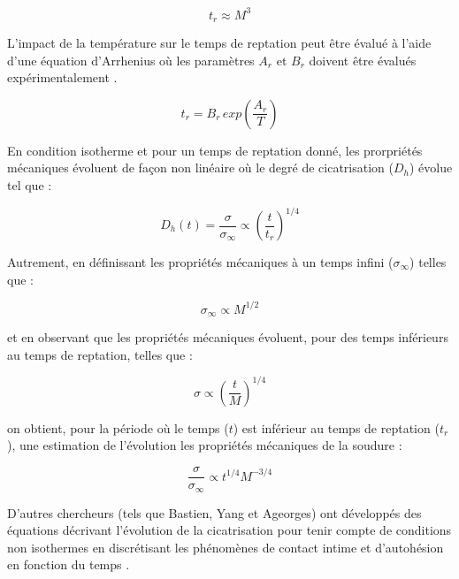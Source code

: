 \begin{equation}
t_r \approx M^3
\end{equation}

L'impact de la température sur le temps de reptation peut être évalué à l'aide d'une équation d'Arrhenius où les paramètres $A_r$ et $B_r$  doivent être évalués expérimentalement \cite{Bastien1991,Ageorges1998}. 

\begin{equation}
t_r = B_r \, exp \left( \frac{A_r}{T} \right)
\end{equation}

En condition isotherme et pour un temps de reptation donné, les prorpriétés mécaniques évoluent de façon non linéaire où le degré de cicatrisation ($D_{h}$) évolue tel que \cite{F.Yang2002} : 

\begin{equation}
D_h \left( t \right) = \frac{\sigma}{\sigma_{\infty}} \propto \left( \frac{t}{t_r} \right)^{1/4}
\end{equation}

Autrement, en définissant les propriétés mécaniques à un temps infini ($\sigma_{\infty}$) telles que \cite{Wool1983} :

\begin{equation}
\sigma_{\infty} \propto M^{1/2}
\end{equation}

et en observant que les propriétés mécaniques évoluent, pour des temps inférieurs au temps de reptation, telles que \cite{Wool1983} :

\begin{equation}
\sigma \propto \left( \frac{t}{M} \right) ^{1/4}
\end{equation}

on obtient, pour la période où le temps ($t$) est inférieur au temps de reptation ($t_r$), une estimation de l'évolution les propriétés mécaniques de la soudure \cite{Wool1983} : 

\begin{equation}
\frac{\sigma}{\sigma_{\infty}} \propto t^{1/4} M^{-3/4}
\end{equation}

D'autres chercheurs (tels que Bastien, Yang et Ageorges) ont développés des équations décrivant l'évolution de la cicatrisation pour tenir compte de conditions non isothermes en discrétisant les phénomènes de contact intime et d'autohésion en fonction du temps  \cite{Bastien1991,F.Yang2002,Ageorges1998}. 

